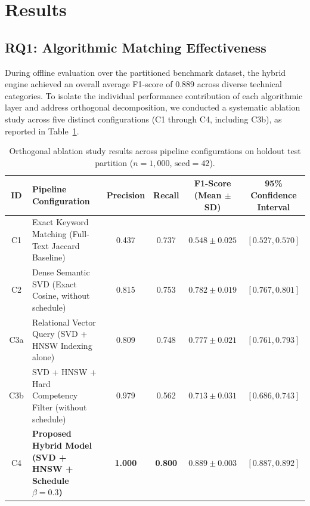 \documentclass[a4paper,fleqn]{cas-dc}
\begin{document}
\section{Results}
\label{sec:results}

\subsection{RQ1: Algorithmic Matching Effectiveness}
During offline evaluation over the partitioned benchmark dataset, the hybrid engine achieved an overall average F1-score of 0.889 across diverse technical categories. To isolate the individual performance contribution of each algorithmic layer and address orthogonal decomposition, we conducted a systematic ablation study across five distinct configurations (C1 through C4, including C3b), as reported in Table~\ref{tbl:ablation}.

\begin{table}[t]
\caption{Orthogonal ablation study results across pipeline configurations on holdout test partition ($n = 1,000$, $\text{seed} = 42$).}
\label{tbl:ablation}
\centering
\footnotesize
\setlength{\tabcolsep}{5pt}
\begin{tabularx}{\textwidth}{@{}c X c c c c@{}}
\toprule
\textbf{ID} & \textbf{Pipeline Configuration} & \textbf{Precision} & \textbf{Recall} & \textbf{F1-Score (Mean $\pm$ SD)} & \textbf{95\% Confidence Interval} \\
\midrule
C1 & Exact Keyword Matching (Full-Text Jaccard Baseline) & 0.437 & 0.737 & $0.548 \pm 0.025$ & $[0.527, 0.570]$ \\
C2 & Dense Semantic SVD (Exact Cosine, without schedule) & 0.815 & 0.753 & $0.782 \pm 0.019$ & $[0.767, 0.801]$ \\
C3a & Relational Vector Query (SVD + HNSW Indexing alone) & 0.809 & 0.748 & $0.777 \pm 0.021$ & $[0.761, 0.793]$ \\
C3b & SVD + HNSW + Hard Competency Filter (without schedule) & 0.979 & 0.562 & $0.713 \pm 0.031$ & $[0.686, 0.743]$ \\
C4 & \textbf{Proposed Hybrid Model (SVD + HNSW + Schedule $\beta = 0.3$)} & \textbf{1.000} & \textbf{0.800} & $\mathbf{0.889 \pm 0.003}$ & $\mathbf{[0.887, 0.892]}$ \\
\bottomrule
\end{tabularx}
\end{table}
\end{document}
